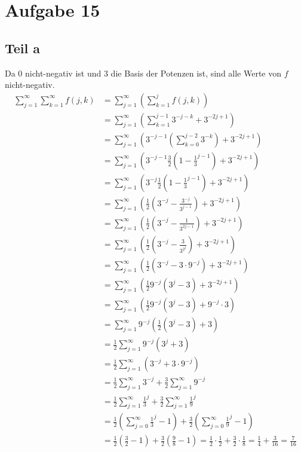 \documentclass[10pt,a4paper]{article}
\begin{document}
\section{Aufgabe 15}

\subsection{Teil a}
Da $0$ nicht-negativ ist und $3$ die Basis der Potenzen ist, sind alle Werte von $f$ nicht-negativ.
\begin{align*}
  \sum_{j = 1}^{\infty} \sum_{k = 1}^{\infty} f(j, k) & = \sum_{j = 1}^{\infty} \left( \sum_{k = 1}^{j} f(j, k) \right)\\
  & = \sum_{j = 1}^{\infty} \left( \sum_{k = 1}^{j - 1} 3^{-j -k} + 3^{-2j + 1} \right)\\
  & = \sum_{j = 1}^{\infty} \left( 3^{-j - 1} \left( \sum_{k = 0}^{j - 2} 3^{-k} \right) + 3^{-2j + 1} \right)\\
  & = \sum_{j = 1}^{\infty} \left( 3^{-j - 1} \frac{3}{2} \left( 1 - \frac{1}{3}^{j - 1} \right) + 3^{-2j + 1} \right)\\
  & = \sum_{j = 1}^{\infty} \left( 3^{-j} \frac{1}{2} \left( 1 - \frac{1}{3}^{j - 1} \right) + 3^{-2j + 1} \right)\\
  & = \sum_{j = 1}^{\infty} \left( \frac{1}{2} \left( 3^{-j} - \frac{3^{-j}}{3^{j - 1}} \right) + 3^{-2j + 1} \right)\\
  & = \sum_{j = 1}^{\infty} \left( \frac{1}{2} \left( 3^{-j} - \frac{1}{3^{2j - 1}} \right) + 3^{-2j + 1} \right)\\
  & = \sum_{j = 1}^{\infty} \left( \frac{1}{2} \left( 3^{-j} - \frac{3}{3^{2^{j}}} \right) + 3^{-2j + 1} \right)\\
  & = \sum_{j = 1}^{\infty} \left( \frac{1}{2} \left( 3^{-j} - 3 \cdot 9^{-j} \right) + 3^{-2j + 1} \right)\\
  & = \sum_{j = 1}^{\infty} \left( \frac{1}{2} 9^{-j} \left( 3^{j} - 3 \right) + 3^{-2j + 1} \right)\\
  & = \sum_{j = 1}^{\infty} \left( \frac{1}{2} 9^{-j} \left( 3^{j} - 3 \right) + 9^{-j} \cdot 3 \right)\\
  & = \sum_{j = 1}^{\infty} 9^{-j} \left( \frac{1}{2} \left( 3^{j} - 3 \right) + 3 \right)\\
  & = \frac{1}{2} \sum_{j = 1}^{\infty} 9^{-j} \left( 3^{j} + 3 \right)\\
  & = \frac{1}{2} \sum_{j = 1}^{\infty} \left( 3^{-j} + 3 \cdot 9^{-j} \right)\\
  & = \frac{1}{2} \sum_{j = 1}^{\infty} 3^{-j} + \frac{3}{2} \sum_{j = 1}^{\infty} 9^{-j}\\
  & = \frac{1}{2} \sum_{j = 1}^{\infty} \frac{1}{3}^{j} + \frac{3}{2} \sum_{j = 1}^{\infty} \frac{1}{9}^{j}\\
  & = \frac{1}{2} \left( \sum_{j = 0}^{\infty} \frac{1}{3}^{j} - 1 \right) + \frac{3}{2} \left( \sum_{j = 0}^{\infty} \frac{1}{9}^{j} - 1\right)\\
  & = \frac{1}{2} \left( \frac{3}{2} - 1 \right) + \frac{3}{2} \left( \frac{9}{8} - 1\right) = \frac{1}{2} \cdot \frac{1}{2} + \frac{3}{2} \cdot \frac{1}{8} = \frac{1}{4} + \frac{3}{16} = \frac{7}{16}
\end{align*}
\end{document}
